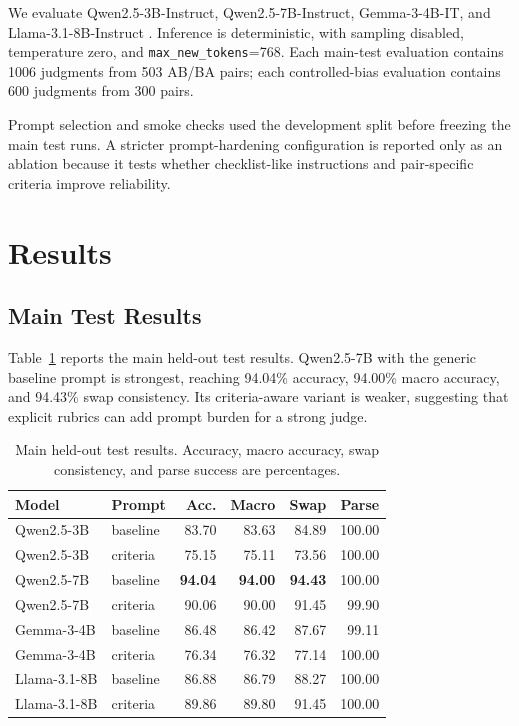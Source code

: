 \documentclass[pdflatex,sn-mathphys-num]{sn-jnl}
\begin{document}
We evaluate Qwen2.5-3B-Instruct, Qwen2.5-7B-Instruct, Gemma-3-4B-IT, and Llama-3.1-8B-Instruct \cite{qwen25,llama3,gemma}. Inference is deterministic, with sampling disabled, temperature zero, and \texttt{max\_new\_tokens}=768. Each main-test evaluation contains 1006 judgments from 503 AB/BA pairs; each controlled-bias evaluation contains 600 judgments from 300 pairs.

Prompt selection and smoke checks used the development split before freezing the main test runs. A stricter prompt-hardening configuration is reported only as an ablation because it tests whether checklist-like instructions and pair-specific criteria improve reliability.

\section{Results}

\subsection{Main Test Results}

Table~\ref{tab:core} reports the main held-out test results. Qwen2.5-7B with the generic baseline prompt is strongest, reaching 94.04\% accuracy, 94.00\% macro accuracy, and 94.43\% swap consistency. Its criteria-aware variant is weaker, suggesting that explicit rubrics can add prompt burden for a strong judge.

\begin{table}[t]
\caption{Main held-out test results. Accuracy, macro accuracy, swap consistency, and parse success are percentages.}
\label{tab:core}
\centering
\footnotesize
\begin{tabular}{llrrrr}
\toprule
Model & Prompt & Acc. & Macro & Swap & Parse \\
\midrule
Qwen2.5-3B & baseline & 83.70 & 83.63 & 84.89 & 100.00 \\
Qwen2.5-3B & criteria & 75.15 & 75.11 & 73.56 & 100.00 \\
Qwen2.5-7B & baseline & \textbf{94.04} & \textbf{94.00} & \textbf{94.43} & 100.00 \\
Qwen2.5-7B & criteria & 90.06 & 90.00 & 91.45 & 99.90 \\
Gemma-3-4B & baseline & 86.48 & 86.42 & 87.67 & 99.11 \\
Gemma-3-4B & criteria & 76.34 & 76.32 & 77.14 & 100.00 \\
Llama-3.1-8B & baseline & 86.88 & 86.79 & 88.27 & 100.00 \\
Llama-3.1-8B & criteria & 89.86 & 89.80 & 91.45 & 100.00 \\
\bottomrule
\end{tabular}
\end{table}
\end{document}
